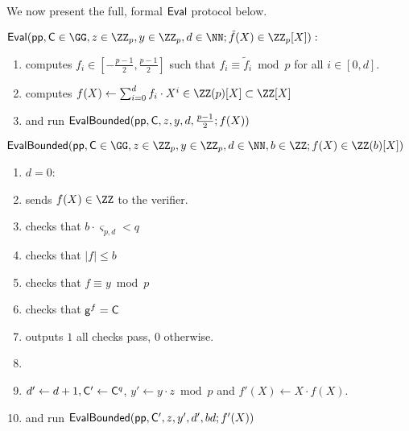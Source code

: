 We now present the full, formal $\textsf{{Eval}}$ protocol below.
\begin{small}
\begin{mdframed}
\begin{minipage}{\textwidth}
			$\pro{Eval}(\crs, \gr{C}\in \GG, z\in \ZZ_p, y\in \ZZ_p, d \in \NN; \tilde{f}(X)\in \ZZ_p[X]) :$ 
			\begin{enumerate}[nolistsep]
			\item \prover computes $f_i \in [-\frac{p-1}{2},\frac{p-1}{2}]$ such that $f_i\equiv \tilde{f}_i\bmod p$ for all $i\in[0,d]$.
			\item \prover computes $f(X)\gets \sum_{i=0}^d f_i \cdot X^{i}\in \ZZ(p)[X]\subset \ZZ[X]$
			\item \prover and \verifier run $\textsf{{EvalBounded}}(\textsf{pp},\mathsf{C},z,y,d,\frac{p-1}{2};f(X))$
		    \end{enumerate}
		    		\vspace{1em}
		$\pro{EvalBounded}(\crs,\gr{C}\in \GG,z\in \ZZ_p,y\in \ZZ_p,d\in \NN,b\in \ZZ;f(X)\in \ZZ(b)[X])$		
	    \begin{enumerate}[nolistsep]
        \item \pcif $d=0$:
        \item \label{line:basestart}\pcind[1] \prover sends $f(X)\in \ZZ$ to the verifier. 

        \item \pcind[1] \verifier checks that $b\cdot \boldsymbol{\varsigma}_{p,d} < q$
        \item \pcind[1] \verifier checks that $|f|\leq b$
          \item \pcind[1] \verifier checks that $f\equiv y \bmod p$
                \item \label{line:baseend}\pcind[1] \verifier checks that $\mathsf{g}^{f}=\mathsf{C}$
\item \pcind[1] \verifier outputs $1$ \pcif all checks pass, $0$ otherwise.
          \item {}
         \item \pcind[1]  $d'\gets d+1, \mathsf{C}'\gets \mathsf{C}^q$, $y'\gets y\cdot z \bmod p$ and $f'(X)\gets X \cdot f(X)$.
         \item \pcind[1] \prover and \verifier run $\textsf{{EvalBounded}}(\textsf{pp},\mathsf{C}',z,y',d',bd;f'(X))$


\end{enumerate}
\end{minipage}
\end{mdframed}
\end{small}

